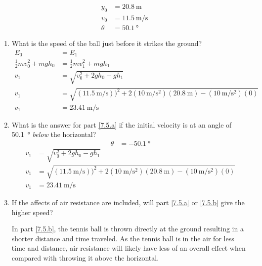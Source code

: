 \documentclass{article}
\begin{document}
\begin{align*}
	y_0 & = \SI{20.8}{\meter} \\
	v_0 & = \SI{11.5}{\meter \per \second} \\
	\theta & = \SI{50.1}{\degree}
\end{align*}
\begin{enumerate}[label = \textbf{(\alph*)}]
	\item \label{7.5.a} What is the speed of the ball just before it strikes the ground?
		\begin{align*}
			E_0 & = E_1 \\
			\frac{1}{2}mv_0^2 + mgh_0 & = \frac{1}{2}mv_1^2 + mgh_1 \\
			v_1 & = \sqrt{ v_0^2 + 2gh_0 - gh_1 } \\
			v_1 & = \sqrt{ (\SI{11.5}{\meter \per \second}))^2 + 2(\SI{10}{\meter \per \second \squared})(\SI{20.8}{\meter}) - (\SI{10}{\meter \per \second \squared})(0) } \\
			v_1 & = \SI{23.41}{\meter \per \second}
		\end{align*}
	\item \label{7.5.b} What is the answer for part \ref{7.5.a} if the initial velocity is at an angle of \SI{50.1}{\degree} \textit{below} the horizontal?
		\begin{align*}
			\theta & = \SI{-50.1}{\degree}
		\end{align*}
		\begin{align*}
			v_1 & = \sqrt{ v_0^2 + 2gh_0 - gh_1 } \\
			v_1 & = \sqrt{ (\SI{11.5}{\meter \per \second}))^2 + 2(\SI{10}{\meter \per \second \squared})(\SI{20.8}{\meter}) - (\SI{10}{\meter \per \second \squared})(0) } \\
			v_1 & = \SI{23.41}{\meter \per \second}
		\end{align*}
	\item If the affects of air resistance are included, will part \ref{7.5.a} or \ref{7.5.b} give the higher speed?
		\begin{mdframed}
			In part \ref{7.5.b}, the tennis ball is thrown directly at the ground resulting in a shorter distance and time traveled. As the tennis ball is in the air for less time and distance, air resistance will likely have less of an overall effect when compared with throwing it above the horizontal.
		\end{mdframed}
\end{enumerate}
\end{document}
